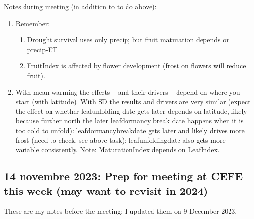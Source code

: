 \documentclass[11pt,letter]{article}
\begin{document}
Notes during meeting (in addition to to do above):
\begin{enumerate}
\item Remember:
\begin{enumerate}
\item Drought survival uses only precip; but fruit maturation depends on precip-ET
\item FruitIndex is affected by flower development (frost on flowers will reduce fruit). 
\end{enumerate}
\item With mean warming the effects -- and their drivers -- depend on where you start (with latitude). With SD the results and drivers are very similar (expect the effect on whether leafunfolding date gets later depends on latitude, likely because further north the later leafdormancy break date happens when it is too cold to unfold): leafdormancybreakdate gets later and likely drives more frost (need to check, see above task); leafunfoldingdate also gets more variable consistently. Note: MaturationIndex depends on LeafIndex. 
\end{enumerate}


\subsection{14 novembre 2023: Prep for meeting at CEFE this week (may want to revisit in 2024)}
These are my notes before the meeting; I updated them on 9 December 2023. 
\end{document}
